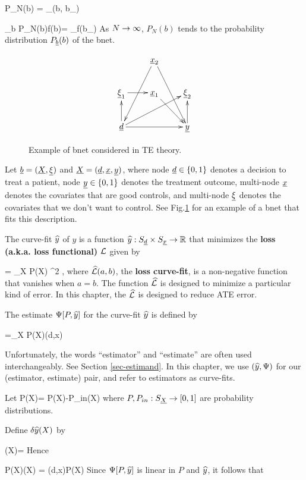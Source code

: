 \beq
P_N(b) = \sum_\s\delta(b, b_\s)
\eeq

\beq
\sum_b P_N(b)f(b)=
\sum_\s f(b_\s)
\eeq
As $N\rightarrow \infty$, $P_N(b)$ tends
to the probability distribution $P_{\underline{b}}(b)$
of the bnet.
\begin{figure}[h!]
$$
\xymatrix{
&\rvx_2\ar[ddl]\ar[ddr]
\\
\ul{\xi}_1\ar[r]
&\rvx_1\ar[dr]
&\ul{\xi}_2
\\
\rvd\ar[rr]\ar[u]\ar[rru]
&
&\rvy\ar[u]
}
$$
\caption{Example of bnet considered in TE
theory.}
\label{fig-targeted-bnet}
\end{figure}

Let ${\underline{b}}=({\underline{X}}, \underline{\xi})$ and
${\underline{X}}=({\underline{d}}, {\underline{x}},{\underline{y}})$,
where
node ${\underline{d}}\in\{0,1\}$ denotes a decision to treat a patient,
node ${\underline{y}}\in \{0,1\}$ denotes the treatment outcome,
multi-node ${\underline{x}}$ denotes the covariates
that are good controls, and multi-node $\underline{\xi}$ denotes
the covariates that we don't want to control.
See Fig.\ref{fig-targeted-bnet}
for an example of a bnet that fits this description.


The curve-fit ${\widehat{y}}$ of $y$
is a function ${\widehat{y}}:S_{\underline{d}}\times S_{\underline{x}}\rightarrow { \mathbb{R}}$
that minimizes the {\bf loss (a.k.a. loss functional)} ${\cal L}$
given by


\beq
\call[P, \haty]= \sum_X P(X) \hatl[y, \haty(d,x)]^2
\;,
\eeq
where ${\widehat{{\cal L}}}(a,b)$, the {\bf loss
curve-fit}, is a
non-negative function
that vanishes when $a=b$.
The function ${\widehat{{\cal L}}}$ is designed
to minimize a particular kind of error.
In this chapter, the ${\widehat{{\cal L}}}$
is designed to reduce ATE error.


The estimate
 $\Psi[P, {\widehat{y}}]$ for the curve-fit ${\widehat{y}}$
is defined by

\beq
\Psi[P, \haty] =\sum_X P(X)\haty(d,x)
\eeq

Unfortunately, the words \enquote{estimator}
and \enquote{estimate} are often used
interchangeably. See Section
\ref{sec-estimand}.
In this chapter, we use $({\widehat{y}}, \Psi)$
for our (estimator, estimate) pair,
and refer to estimators as curve-fits.


Let
\beq
\delta P(X)=
P(X)-P_{in}(X)
\eeq
where $P, P_{in}:S_{\underline{X}}\rightarrow [0,1]$ are
probability distributions.

Define $\delta{\widehat{y}}(X)$ by

\beq
\delta\haty(X)= 
\eeq
Hence

\beq
P(X)\delta\haty(X) = \haty(d,x)\delta P(X)
\eeq
Since $\Psi[P, {\widehat{y}}]$
is linear in $P$ and ${\widehat{y}}$,
it follows that

